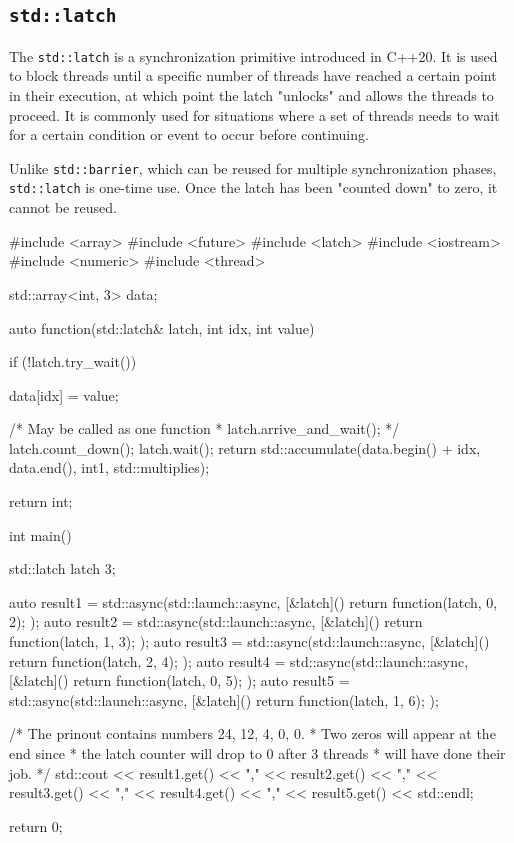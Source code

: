 \documentclass[../main]{subfiles}
\begin{document}
\subsection{\texttt{std::latch}}
    The \texttt{std::latch} is a synchronization primitive introduced in
C++20. It is used to block threads until a specific number of threads have
reached a certain point in their execution, at which point the latch
"unlocks" and allows the threads to proceed. It is commonly used
for situations where a set of threads needs to wait for a certain
condition or event to occur before continuing.\newline

    Unlike \texttt{std::barrier}, which can be reused for multiple
synchronization phases, \texttt{std::latch} is one-time use.
Once the latch has been "counted down" to zero, it cannot be reused.
\begin{Code}
    #include <array>
    #include <future>
    #include <latch>
    #include <iostream>
    #include <numeric>
    #include <thread>

    std::array<int, 3> data{};

    auto function(std::latch& latch, int idx, int value)
    {
        if (!latch.try_wait())
        {
            data[idx] = value;

            /* May be called as one function
             * latch.arrive_and_wait();
             */
            latch.count_down();
            latch.wait();
            return std::accumulate(data.begin() + idx, data.end(),
                int{1}, std::multiplies{});
        }
        return int{};
    }

    int main()
    {
        std::latch latch {3};

        auto result1 = std::async(std::launch::async,
            [&latch]() { return function(latch, 0, 2); });
        auto result2 = std::async(std::launch::async,
            [&latch]() { return function(latch, 1, 3); });
        auto result3 = std::async(std::launch::async,
            [&latch]() { return function(latch, 2, 4); });
        auto result4 = std::async(std::launch::async,
            [&latch]() { return function(latch, 0, 5); });
        auto result5 = std::async(std::launch::async,
            [&latch]() { return function(latch, 1, 6); });

        /* The prinout contains numbers 24, 12, 4, 0, 0.
         * Two zeros will appear at the end since
         * the latch counter will drop to 0 after 3 threads
         * will have done their job.
         */
        std::cout << result1.get() << ","
                  << result2.get() << ","
                  << result3.get() << ","
                  << result4.get() << ","
                  << result5.get() << std::endl;

        return 0;
    }
\end{Code}
\end{document}
